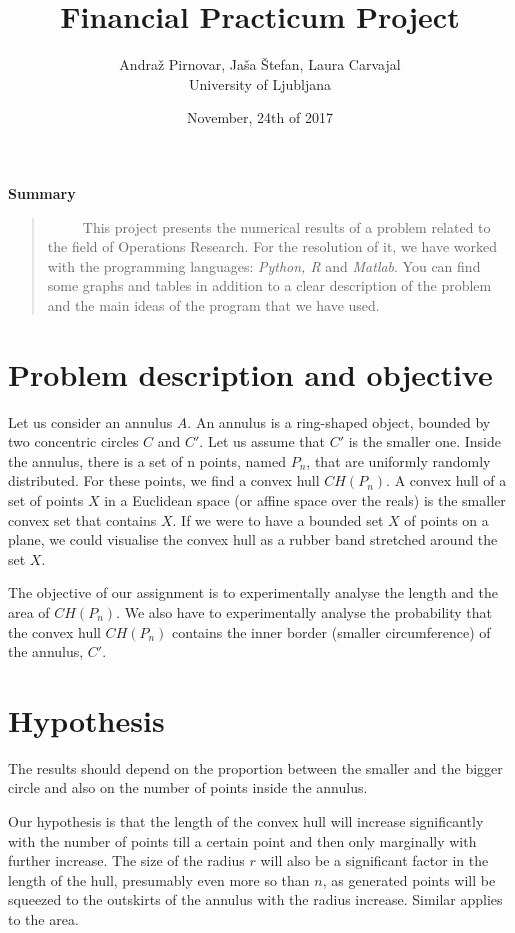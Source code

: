 \documentclass[12pt,a4paper]{article}
\begin{document}
\title{\bf Financial Practicum Project }
\author{Andraž Pirnovar, Jaša Štefan, Laura Carvajal  \\ University of Ljubljana}
\date{November, 24th of 2017}
\maketitle{}
\begin{center}
{\small{\bf Summary}}\end{center}
\begin{quote}
{\small 
\ \ \ \ \ This project presents the numerical results of a problem related to the field of Operations Research. For the resolution of it, we have worked with the programming languages: \textit{Python, R} and \textit{Matlab}. You can find some graphs and tables in addition to a clear description of the problem and the main ideas of the program that we have used.}
\end{quote}
\bigskip 
\section{Problem description and objective}
Let us consider an annulus $A$. An annulus is a ring-shaped object, bounded by two concentric circles $C$ and $C'$. Let us assume that $C'$ is the smaller one. Inside the annulus, there is a set of n points, named $P_n$, that are uniformly randomly distributed. For these points, we find a convex hull $CH(P_n)$. A convex hull of a set of points $X$ in a Euclidean space (or affine space over the reals) is the smaller convex set that contains $X$. If we were to have a bounded set $X$ of points on a plane, we could visualise the convex hull as a rubber band stretched around the set $X$. \medskip 
 
The objective of our assignment is to experimentally analyse the length and the area of $CH(P_n)$. We also have to experimentally analyse the probability that the convex hull $CH(P_n)$ contains the inner border (smaller circumference) of the annulus, $C'$. 
\pagebreak 

\section{Hypothesis}
The results should depend on the proportion between the smaller and the bigger circle and also on the number of points inside the annulus.\medskip  
 
Our hypothesis is that the length of the convex hull will increase significantly with the number of points till a certain point and then only marginally with further increase. The size of the radius $r$ will also be a significant factor in the length of the hull, presumably even more so than $n$, as generated points will be squeezed to the outskirts of the annulus with the radius increase. Similar applies to the area.  \medskip 
 
\end{document}
